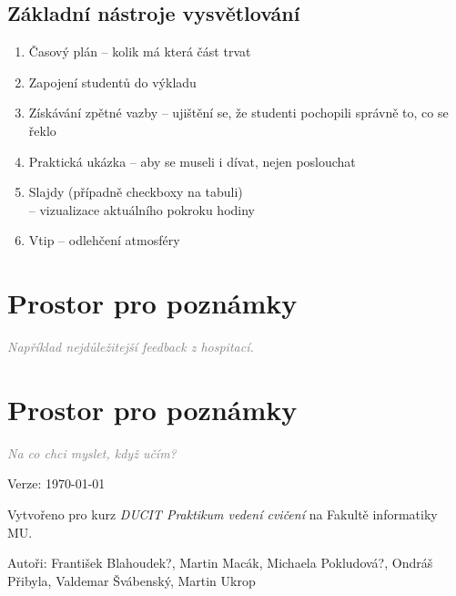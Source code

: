 \documentclass[twoside,openany,10pt]{book}
\newcommand{\note}[1]{\textcolor{gray}{\small\itshape #1}}
\begin{document}
\section*{Základní nástroje vysvětlování}
\begin{enumerate}
\item Časový plán -- kolik má která část trvat
\item Zapojení studentů do výkladu
\item Získávání zpětné vazby -- ujištění se, že studenti pochopili správně to, co se řeklo
\item Praktická ukázka -- aby se museli i dívat, nejen poslouchat
\item Slajdy (případně checkboxy na tabuli)\\ -- vizualizace aktuálního pokroku hodiny
\item Vtip -- odlehčení atmosféry
\end{enumerate}

\chapter*{Prostor pro poznámky}
\note{Například nejdůležitejší feedback z hospitací.}

\chapter*{Prostor pro poznámky}
\note{Na co chci myslet, když učím?}

\newpage
\vspace*{\fill}
Verze: \today

Vytvořeno pro kurz \textit{DUCIT Praktikum vedení cvičení} na Fakultě informatiky MU.

Autoři: František Blahoudek?, Martin Macák, Michaela Pokludová?, Ondráš Přibyla, Valdemar Švábenský, Martin Ukrop
\end{document}
